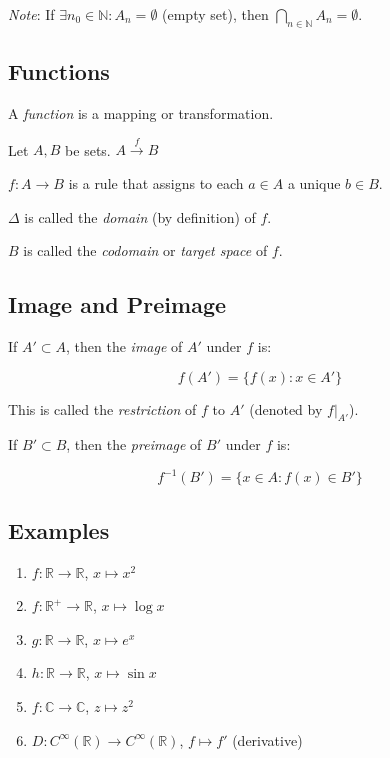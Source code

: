 \documentclass[12pt,a4paper]{article}
\begin{document}
\textit{Note}: If $\exists n_0 \in \mathbb{N} : A_n = \emptyset$ (empty set), then $\bigcap_{n \in \mathbb{N}} A_n = \emptyset$.

\subsection{Functions}

A \textit{function} is a mapping or transformation.

Let $A, B$ be sets. $A \xrightarrow{f} B$

$f : A \to B$ is a rule that assigns to each $a \in A$ a unique $b \in B$.

$\Delta$ is called the \textit{domain} (by definition) of $f$.

$B$ is called the \textit{codomain} or \textit{target space} of $f$.

\subsection{Image and Preimage}

If $A' \subset A$, then the \textit{image} of $A'$ under $f$ is:

\[f(A') = \{f(x) : x \in A'\}\]

This is called the \textit{restriction} of $f$ to $A'$ (denoted by $f|_{A'}$).

If $B' \subset B$, then the \textit{preimage} of $B'$ under $f$ is:

\[f^{-1}(B') = \{x \in A : f(x) \in B'\}\]

\subsection{Examples}

\begin{enumerate}
    \item $f : \mathbb{R} \to \mathbb{R}$, $x \mapsto x^2$
    \item $f : \mathbb{R}^+ \to \mathbb{R}$, $x \mapsto \log x$
    \item $g : \mathbb{R} \to \mathbb{R}$, $x \mapsto e^x$
    \item $h : \mathbb{R} \to \mathbb{R}$, $x \mapsto \sin x$
    \item $f : \mathbb{C} \to \mathbb{C}$, $z \mapsto z^2$
    \item $D : C^\infty(\mathbb{R}) \to C^\infty(\mathbb{R})$, $f \mapsto f'$ (derivative)
\end{enumerate}
\end{document}
